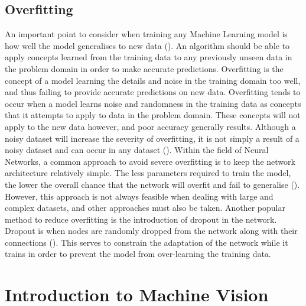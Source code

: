 \documentclass[12pt]{report}
\begin{document}
\subsection{Overfitting}
\begin{flushleft}
An important point to consider when training any Machine Learning model is how well the model generalises to new data (\cite{domingos2012few}). An algorithm should be able to apply concepts learned from the training data to any previously unseen data in the problem domain in order to make accurate predictions. Overfitting is the concept of a model learning the details and noise in the training domain too well, and thus failing to provide accurate predictions on new data. Overfitting tends to occur when a model learns noise and randomness in the training data as concepts that it attempts to apply to data in the problem domain. These concepts will not apply to the new data however, and poor accuracy generally results. Although a noisy dataset will increase the severity of overfitting, it is not simply a result of a noisy dataset and can occur in any dataset (\cite{domingos2012few}). Within the field of Neural Networks, a common approach to avoid severe overfitting is to keep the network architecture relatively simple. The less parameters required to train the model, the lower the overall chance that the network will overfit and fail to generalise (\cite{o2015introduction}). However, this approach is not always feasible when dealing with large and complex datasets, and other approaches must also be taken. Another popular method to reduce overfitting is the introduction of dropout in the network. Dropout is when nodes are randomly dropped from the network along with their connections (\cite{srivastava2014dropout}). This serves to constrain the adaptation of the network while it trains in order to prevent the model from over-learning the training data.

\end{flushleft}

\section{Introduction to Machine Vision}
\end{document}
